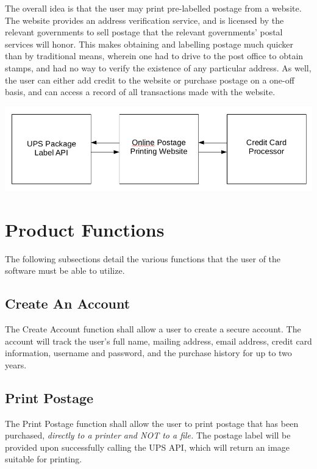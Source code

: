 \documentclass{scrreprt}
\begin{document}
The overall idea is that the user may print pre-labelled postage from a
website. The website provides an address verification service, and is licensed
by the relevant governments to sell postage that the relevant governments’
postal services will honor. This makes obtaining and labelling postage much
quicker than by traditional means, wherein one had to drive to the post office
to obtain stamps, and had no way to verify the existence of any particular
address. As well, the user can either add credit to the website or purchase
postage on a one-off basis, and can access a record of all transactions made
with the website.

\includegraphics[scale=.4]{2-1-product-perspective.png}

\section{Product Functions}

The following subsections detail the various functions that the user of the 
software must be able to utilize.

\subsection{Create An Account}

The Create Account function shall allow a user to create a secure account. The
account will track the user’s full name, mailing address, email address, credit
card information, username and password, and the purchase history for up to two
years.

\subsection{Print Postage}

The Print Postage function shall allow the user to print postage that has been 
purchased, \emph{directly to a printer and NOT to a file.} The postage label 
will be provided upon successfully calling the UPS API, which will return an 
image suitable for printing. 
\end{document}
